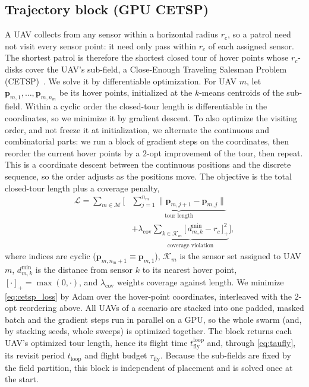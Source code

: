 \subsection{Trajectory block (GPU CETSP)}
\label{subsec:traj_block}
A UAV collects from any sensor within a horizontal radius $r_c$, so a patrol
need not visit every sensor point: it need only pass within $r_c$ of each
assigned sensor. The shortest patrol is therefore the shortest closed tour of
hover points whose $r_c$-disks cover the UAV's sub-field, a Close-Enough
Traveling Salesman Problem (CETSP)~\cite{cetsp}. We solve it by differentiable
optimization. For UAV $m$, let $\mathbf{p}_{m,1},\dots,\mathbf{p}_{m,n_m}$ be
its hover points, initialized at the $k$-means centroids of the sub-field. Within
a cyclic order the closed-tour length is differentiable in the coordinates, so we
minimize it by gradient descent. To also optimize the visiting order, and not
freeze it at initialization, we alternate the continuous and combinatorial parts:
we run a block of gradient steps on the coordinates, then reorder the current
hover points by a $2$-opt improvement of the tour, then repeat. This is a
coordinate descent between the continuous positions and the discrete sequence,
so the order adjusts as the positions move. The objective is the total
closed-tour length plus a coverage penalty,
\begin{equation}
\begin{split}
  \mathcal{L}
  = \sum_{m\in\mathcal{M}}
    \Bigg[
    &\underbrace{\sum_{j=1}^{n_m}\big\|\mathbf{p}_{m,j{+}1}-\mathbf{p}_{m,j}\big\|}_{\text{tour length}}\\
    &+ \lambda_{\mathrm{cov}}
      \underbrace{\sum_{k\in\mathcal{K}_m}\big[\,d_{m,k}^{\min}-r_c\,\big]_+^2}_{\text{coverage violation}}\Bigg],
\end{split}
  \label{eq:cetsp_loss}
\end{equation}
where indices are cyclic ($\mathbf{p}_{m,n_m{+}1}\equiv\mathbf{p}_{m,1}$),
$\mathcal{K}_m$ is the sensor set assigned to UAV $m$, $d_{m,k}^{\min}$ is the
distance from sensor $k$ to its nearest hover point, $[\cdot]_+=\max(0,\cdot)$,
and $\lambda_{\mathrm{cov}}$ weights coverage against length. We minimize
\eqref{eq:cetsp_loss} by Adam over the hover-point coordinates, interleaved with
the $2$-opt reordering above. All UAVs of a scenario are stacked into one padded,
masked batch and the gradient steps run in parallel on a GPU, so the whole swarm
(and, by stacking seeds, whole sweeps) is optimized together. The block returns each UAV's optimized tour length, hence its
flight time $t_{\mathrm{fly}}^{\mathrm{loop}}$ and, through \eqref{eq:taufly},
its revisit period $t_{\mathrm{loop}}$ and flight budget $\tau_{\mathrm{fly}}$.
Because the sub-fields are fixed by the field partition, this block is
independent of placement and is solved once at the start.

